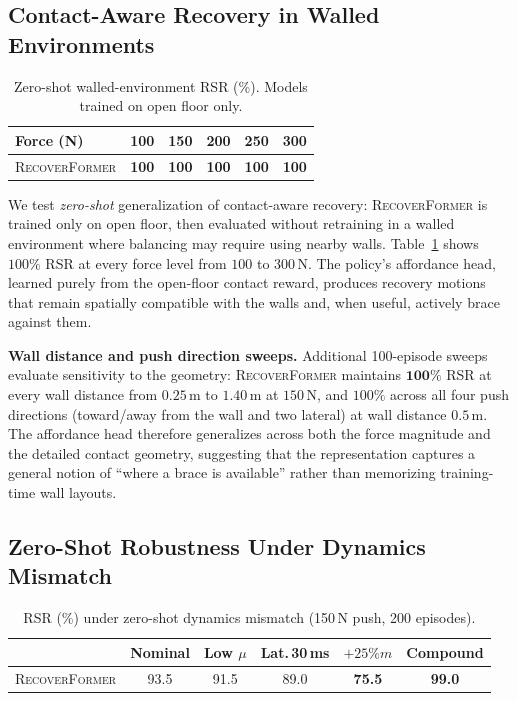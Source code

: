 \documentclass[conference,letterpaper]{IEEEtran}
\newcommand{\methodname}{\textsc{RecoverFormer}}
\begin{document}
\subsection{Contact-Aware Recovery in Walled Environments}
\label{sec:exp_contact}

\begin{table}[t]
    \centering
    \caption{Zero-shot walled-environment RSR (\%). Models trained on open floor only.}
    \label{tab:walled_force_sweep}
    \begin{tabular}{lccccc}
        \toprule
        Force (N) & 100 & 150 & 200 & 250 & 300 \\
        \midrule
        \methodname{}  & \textbf{100} & \textbf{100} & \textbf{100} & \textbf{100} & \textbf{100} \\
        \bottomrule
    \end{tabular}
\end{table}

We test \emph{zero-shot} generalization of contact-aware recovery: \methodname{} is trained only on open floor, then evaluated without retraining in a walled environment where balancing may require using nearby walls.
Table~\ref{tab:walled_force_sweep} shows $100\%$ RSR at every force level from $100$ to $300$\,N.
The policy's affordance head, learned purely from the open-floor contact reward, produces recovery motions that remain spatially compatible with the walls and, when useful, actively brace against them.

\textbf{Wall distance and push direction sweeps.}
Additional 100-episode sweeps evaluate sensitivity to the geometry:
\methodname{} maintains $\mathbf{100\%}$ RSR at every wall distance from $0.25$\,m to $1.40$\,m at $150$\,N, and $100\%$ across all four push directions (toward/away from the wall and two lateral) at wall distance $0.5$\,m.
The affordance head therefore generalizes across both the force magnitude and the detailed contact geometry, suggesting that the representation captures a general notion of ``where a brace is available'' rather than memorizing training-time wall layouts.

\subsection{Zero-Shot Robustness Under Dynamics Mismatch}
\label{sec:exp_robustness}

\begin{table}[t]
    \centering
    \caption{RSR (\%) under zero-shot dynamics mismatch (150\,N push, 200 episodes).}
    \label{tab:robustness}
    \setlength{\tabcolsep}{3pt}
    \begin{tabular}{lccccc}
        \toprule
        & Nominal & Low $\mu$ & Lat.\,30\,ms & $+25\%m$ & Compound \\
        \midrule
        \methodname{} & 93.5 & 91.5 & 89.0 & \textbf{75.5} & \textbf{99.0} \\
        \bottomrule
    \end{tabular}
\end{table}
\end{document}
